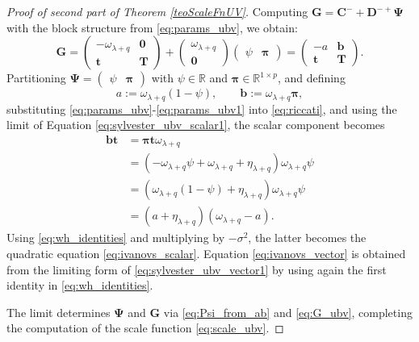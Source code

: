 \documentclass[a4paper,11pt]{article}
\numberwithin{equation}{section}
\theoremstyle{plain}
\theoremstyle{definition}
\newcommand{\1}{\mathbf{1}}
\begin{document}
\begin{proof}[Proof of second part of Theorem \ref{teoScaleFnUV}]
Computing $\bm{G} = \bm{C}^- + \bm{D}^{-+}\bm{\Psi}$ with the block structure from \eqref{eq:params_ubv}, we obtain:
\begin{equation}\label{eq:G_ubv}
\bm{G} = \begin{pmatrix}-\omega_{\lambda+q} & \bm{0} \\ \bm{t} & \bm{T}\end{pmatrix} + \begin{pmatrix}\omega_{\lambda+q} \\ \bm{0}\end{pmatrix}\begin{pmatrix}\psi & \bm{\pi}\end{pmatrix} = \begin{pmatrix}-a & \bm{b} \\ \bm{t} & \bm{T}\end{pmatrix}.
\end{equation}
Partitioning $\bm{\Psi} = \begin{pmatrix}\psi & \bm{\pi}\end{pmatrix}$ with $\psi \in \mathbb{R}$ and $\bm{\pi} \in \mathbb{R}^{1 \times p}$, and defining
\begin{equation}\label{eq:ab_def}
a := \omega_{\lambda+q}(1-\psi), \qquad \bm{b} := \omega_{\lambda+q}\bm{\pi},
\end{equation}
substituting \eqref{eq:params_ubv}-\eqref{eq:params_ubv1} into \eqref{eq:riccati}, 
and using the limit of Equation \eqref{eq:sylvester_ubv_scalar1},  the scalar component becomes
\[
\begin{split}
\bm b\bm t& =\bm \pi \bm t\omega_{\lambda+q}\\
&= (-\omega_{\lambda+q}\psi+\omega_{\lambda+q}+\eta_{\lambda+q})\omega_{\lambda+q}\psi\\
&= (\omega_{\lambda+q}(1-\psi)+\eta_{\lambda+q})\omega_{\lambda+q}\psi\\
& = (a+\eta_{\lambda+q})(\omega_{\lambda+q}-a).
\end{split}
\]
Using \eqref{eq:wh_identities} and multiplying by $-\sigma^2$, the latter becomes the quadratic equation \eqref{eq:ivanovs_scalar}. Equation \eqref{eq:ivanovs_vector} is obtained from the limiting form of \eqref{eq:sylvester_ubv_vector1} by using again the first identity in \eqref{eq:wh_identities}.

%
%
The limit determines $\bm{\Psi}$ and $\bm{G}$ via \eqref{eq:Psi_from_ab} and \eqref{eq:G_ubv}, completing the computation of the scale function \eqref{eq:scale_ubv}.
\end{proof}
\end{document}
